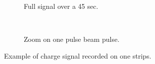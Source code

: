 \begin{figure}[!ht]
  \begin{subfigure}{0.5\textwidth}
    
    \caption{Full signal over a 45 sec.}
    \label{}
  \end{subfigure}
  ~
  \begin{subfigure}{0.5\textwidth}
    
    \caption{Zoom on one pulse beam pulse.}
    \label{}
  \end{subfigure}
  \caption[Example of charge signal recorded on one strips]{Example of charge signal recorded on one strips.}
  \label{chap4:strips_signal}
\end{figure}

